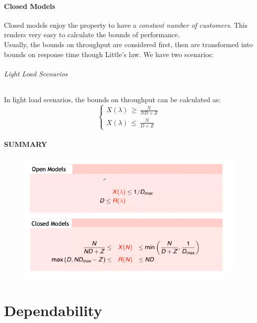 \documentclass[10pt,a4paper]{article}
\begin{document}
			\subsection{Closed Models}
				Closed models enjoy the property to have a \emph{constant number of customers}. This renders very easy to calculate the bounds of performance.\\
				Usually, the bounds on throughput are considered first, then are transformed into bounds on response time though Little's law. We have two scenarios:
				
				\paragraph{Light Load Scenarios}
					In light load scenarios, the bounds on throughput can be calculated as:
					\begin{equation}
						\begin{cases}
							X(\lambda) \,\geq\, \frac{N}{ND + Z}\\
							X(\lambda) \,\leq\, \frac{N}{D + Z}
						\end{cases}
					\end{equation}
				
				
			\subsection{SUMMARY}	
				\begin{figure}
					\centering
					\includegraphics[width = \textwidth]{./images/superSummary2.png}
				\end{figure}
				
	\clearpage \part{Dependability}
\end{document}
